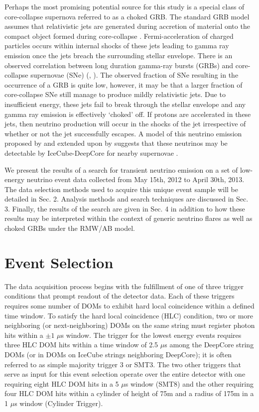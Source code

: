 \documentclass[manuscript]{aastex}
\begin{document}
Perhaps the most promising potential source for this study is a special class of core-collapse supernova referred to as a choked GRB. The standard GRB model assumes that relativistic jets are generated during accretion of material onto the compact object formed during core-collapse \citep{1992MNRAS.258P..41R}. Fermi-acceleration of charged particles occurs within internal shocks of these jets leading to gamma ray emission once the jets breach the surrounding stellar envelope. There is an observed correlation between long duration gamma-ray bursts (GRBs) and core-collapse supernovae (SNe) (\citep{2006ARA&A..44..507W}, \citep{2011AN....332..434M}). The observed fraction of SNe resulting in the occurrence of a GRB is quite low, however, it may be that a larger fraction of core-collapse SNe still manage to produce mildly relativistic jets.  Due to insufficient energy, these jets fail to break through the stellar envelope and any gamma ray emission is effectively `choked' off. If protons are accelerated in these jets, then neutrino production will occur in the shocks of the jet irrespective of whether or not the jet successfully escapes. A model of this neutrino emission proposed by \cite{2004PhRvL..93r1101R} and extended upon by \cite{2005PhRvL..95f1103A} suggests that these neutrinos may be detectable by IceCube-DeepCore for nearby supernovae \citep{PhysRevD.81.083011}.

We present the results of a search for transient neutrino emission on a set of low-energy neutrino event data collected from May 15th, 2012 to April 30th, 2013. The data selection methods used to acquire this unique event sample will be detailed in Sec. 2. Analysis methods and search techniques are discussed in Sec. 3. Finally, the results of the search are given in Sec. 4 in addition to how these results may be interpreted within the context of generic neutrino flares as well as choked GRBs under the RMW/AB model.
\section{Event Selection}

The data acquisition process begins with the fulfillment of one of three trigger conditions that prompt readout of the detector data. Each of these triggers requires some number of DOMs to exhibit hard local coincidence within a defined time window. To satisfy the hard local coincidence (HLC) condition, two or more neighboring (or next-neighboring) DOMs on the same string must register photon hits within a $\pm1$ $\mu$s window. The trigger for the lowest energy events requires three HLC DOM hits within a time window of 2.5 $\mu$s among the DeepCore string DOMs (or in DOMs on IceCube strings neighboring DeepCore); it is often referred to as simple majority trigger 3 or SMT3. The two other triggers that serve as input for this event selection operate over the entire detector with one requiring eight HLC DOM hits in a 5 $\mu$s window (SMT8) and the other requiring four HLC DOM hits within a cylinder of height of 75m and a radius of 175m in a 1 $\mu$s window (Cylinder Trigger).
\end{document}
